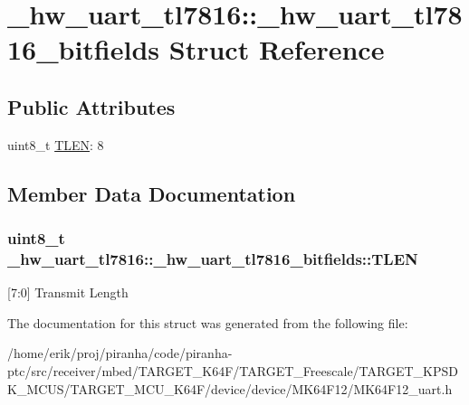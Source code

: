 \hypertarget{struct__hw__uart__tl7816_1_1__hw__uart__tl7816__bitfields}{}\section{\+\_\+hw\+\_\+uart\+\_\+tl7816\+:\+:\+\_\+hw\+\_\+uart\+\_\+tl7816\+\_\+bitfields Struct Reference}
\label{struct__hw__uart__tl7816_1_1__hw__uart__tl7816__bitfields}
\subsection*{Public Attributes}
\begin{DoxyCompactItemize}
\item 
uint8\+\_\+t \hyperlink{struct__hw__uart__tl7816_1_1__hw__uart__tl7816__bitfields_a42b6e7bca09512ca7a9d1bd63d40311a}{T\+L\+EN}\+: 8
\end{DoxyCompactItemize}


\subsection{Member Data Documentation}
\subsubsection[{\texorpdfstring{T\+L\+EN}{TLEN}}]{\setlength{\rightskip}{0pt plus 5cm}uint8\+\_\+t \+\_\+hw\+\_\+uart\+\_\+tl7816\+::\+\_\+hw\+\_\+uart\+\_\+tl7816\+\_\+bitfields\+::\+T\+L\+EN}\hypertarget{struct__hw__uart__tl7816_1_1__hw__uart__tl7816__bitfields_a42b6e7bca09512ca7a9d1bd63d40311a}{}\label{struct__hw__uart__tl7816_1_1__hw__uart__tl7816__bitfields_a42b6e7bca09512ca7a9d1bd63d40311a}
\mbox{[}7\+:0\mbox{]} Transmit Length 

The documentation for this struct was generated from the following file\+:\begin{DoxyCompactItemize}
\item 
/home/erik/proj/piranha/code/piranha-\/ptc/src/receiver/mbed/\+T\+A\+R\+G\+E\+T\+\_\+\+K64\+F/\+T\+A\+R\+G\+E\+T\+\_\+\+Freescale/\+T\+A\+R\+G\+E\+T\+\_\+\+K\+P\+S\+D\+K\+\_\+\+M\+C\+U\+S/\+T\+A\+R\+G\+E\+T\+\_\+\+M\+C\+U\+\_\+\+K64\+F/device/device/\+M\+K64\+F12/M\+K64\+F12\+\_\+uart.\+h\end{DoxyCompactItemize}
